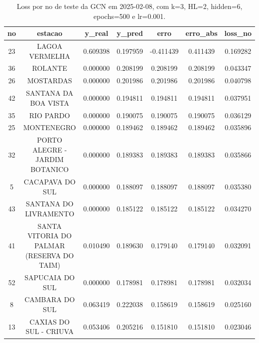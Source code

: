 \begin{table}[h]
\centering
\caption{Loss por no de teste da GCN em 2025-02-08, com k=3, HL=2, hidden=6, epochs=500 e lr=0.001.}
\label{tab:gcn_loss_k3_hl2_h6_e500_d20250208}
\begin{tabular}{ccccccc}
\toprule
no & estacao & y\_real & y\_pred & erro & erro\_abs & loss\_no \\
\midrule
23 & LAGOA VERMELHA & 0.609398 & 0.197959 & -0.411439 & 0.411439 & 0.169282 \\
36 & ROLANTE & 0.000000 & 0.208199 & 0.208199 & 0.208199 & 0.043347 \\
26 & MOSTARDAS & 0.000000 & 0.201986 & 0.201986 & 0.201986 & 0.040798 \\
42 & SANTANA DA BOA VISTA & 0.000000 & 0.194811 & 0.194811 & 0.194811 & 0.037951 \\
35 & RIO PARDO & 0.000000 & 0.190075 & 0.190075 & 0.190075 & 0.036129 \\
25 & MONTENEGRO & 0.000000 & 0.189462 & 0.189462 & 0.189462 & 0.035896 \\
32 & PORTO ALEGRE - JARDIM BOTANICO & 0.000000 & 0.189383 & 0.189383 & 0.189383 & 0.035866 \\
5 & CACAPAVA DO SUL & 0.000000 & 0.188097 & 0.188097 & 0.188097 & 0.035380 \\
43 & SANTANA DO LIVRAMENTO & 0.000000 & 0.185122 & 0.185122 & 0.185122 & 0.034270 \\
41 & SANTA VITORIA DO PALMAR (RESERVA DO TAIM) & 0.010490 & 0.189630 & 0.179140 & 0.179140 & 0.032091 \\
52 & SAPUCAIA DO SUL & 0.000000 & 0.178981 & 0.178981 & 0.178981 & 0.032034 \\
8 & CAMBARA DO SUL & 0.063419 & 0.222038 & 0.158619 & 0.158619 & 0.025160 \\
13 & CAXIAS DO SUL - CRIUVA & 0.053406 & 0.205216 & 0.151810 & 0.151810 & 0.023046 \\
\bottomrule
\end{tabular}
\end{table}
